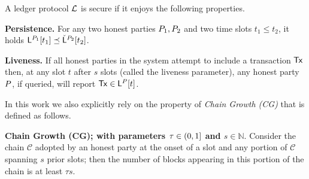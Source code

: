 \begin{definition}\label{de:ledger} A ledger protocol $\mathcal{L}$ is secure if it enjoys the following properties.



\begin{myitemize}
  \item[]{\bf Persistence.}
    For any two honest parties $P_1,P_2$ and two time slots $t_1\leq t_2$,
    it holds  $\mathsf{L}^{P_1}[t_1] \preceq
    \check{\mathsf{L}}^{P_2}[t_2]$.

  \item[]{\bf Liveness.}
    If all honest parties in the system attempt to include a  transaction $\mathsf{Tx}$
    then, at any slot $t$ after $s$ slots (called the
    liveness parameter), any honest party $P$, if queried,
    will report $\mathsf{Tx} \in \mathsf{L}^{P}[t]$.
\end{myitemize}

\end{definition}

In this work we also explicitly rely on the property of \emph{Chain Growth (CG)} that is defined as follows.

\begin{myitemize}
  \item[] {\bf Chain Growth (CG); with parameters $\tau\in (0,1]$ and $s\in\mathbb{N}$}. Consider the chain $\mathcal{C}$
  adopted by an honest party at the onset of a slot and any portion of $\mathcal{C}$ spanning $s$ prior slots; then the number of 
  blocks appearing in this portion of the chain is at least $\tau s$.
 \end{myitemize}



